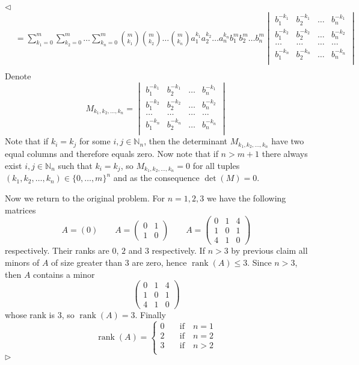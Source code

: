 \documentclass[12pt]{article}
\newenvironment{solution}{\par $\triangleleft$}{$\triangleright$}
\begin{document}
\begin{solution}
$$\begin{aligned}
&=\sum\limits_{k_1=0}^m\sum\limits_{k_2=0}^m\ldots\sum\limits_{k_n=0}^m\binom{m}{k_1}\binom{m}{k_2}\ldots\binom{m}{k_n}a_1^{k_1}a_2^{k_2}\ldots a_n^{k_n} b_1^m b_2^m\ldots b_n^m
\begin{vmatrix}
b_1^{-k_1} & b_2^{-k_1} & \ldots & b_n^{-k_1} \\
b_1^{-k_2} & b_2^{-k_2} & \ldots & b_n^{-k_2} \\
\ldots                & \ldots                & \ldots & \ldots                \\
b_1^{-k_n} & b_2^{-k_n} & \ldots & b_n^{-k_n} \\
\end{vmatrix}\\
\end{aligned}
$$
Denote
$$
M_{k_1,k_2,\ldots,k_n}=
\begin{vmatrix}
b_1^{-k_1} & b_2^{-k_1} & \ldots & b_n^{-k_1} \\
b_1^{-k_2} & b_2^{-k_2} & \ldots & b_n^{-k_2} \\
\ldots                & \ldots                & \ldots & \ldots                \\
b_1^{-k_n} & b_2^{-k_n} & \ldots & b_n^{-k_n} \\
\end{vmatrix}
$$
Note that if $k_i=k_j$ for some $i,j\in\mathbb{N}_n$, then the determinant $M_{k_1,k_2,\ldots,k_n}$ have two equal columns and therefore equals zero. Now note that if $n>m+1$ there always exist $i,j\in\mathbb{N}_n$ such that $k_i=k_j$, so $M_{k_1,k_2,\ldots,k_n}=0$ for all tuples $(k_1,k_2,\ldots,k_n)\in \{0,\ldots,m\}^n$ and as the consequence $\det(M)=0$. 
 
Now we return to the original problem. For $n=1,2,3$ we have the following matrices
$$
A=(0)\qquad 
A=\begin{pmatrix}0&1\\1&0\end{pmatrix}\qquad 
A=\begin{pmatrix}0&1&4\\1&0&1\\4&1&0 \end{pmatrix}
$$
respectively. Their ranks are $0$, $2$ and $3$ respectively. If $n>3$ by previous claim all minors of $A$ of size greater than $3$ are zero, hence $\operatorname{rank}(A)\leq 3$. Since $n>3$, then $A$ contains a minor 
$$
\begin{pmatrix}0&1&4\\1&0&1\\4&1&0 \end{pmatrix}
$$
whose rank is $3$, so $\operatorname{rank}(A)=3$. Finally
$$
\operatorname{rank}(A)=
\begin{cases}
0 & \quad\mbox{if}\quad n=1\\
2 & \quad\mbox{if}\quad n=2\\
3 & \quad\mbox{if}\quad n>2\\
\end{cases}
$$
\end{solution}
 
\end{document}
